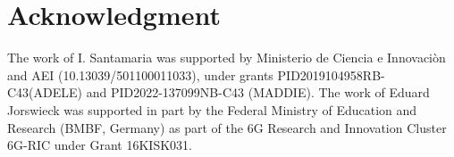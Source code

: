 \documentclass[a4, conference]{IEEEtran}
\theoremstyle{definition}
\begin{document}
\section*{Acknowledgment}
The work of I. Santamaria was supported by Ministerio de Ciencia e Innovaci\`on and AEI (10.13039/501100011033), under grants PID2019104958RB-C43(ADELE) and PID2022-137099NB-C43 (MADDIE). The work of Eduard Jorswieck was supported in part by the Federal Ministry of Education and Research (BMBF, Germany) as part of the 6G Research and Innovation Cluster 6G-RIC under Grant 16KISK031.




\end{document}
